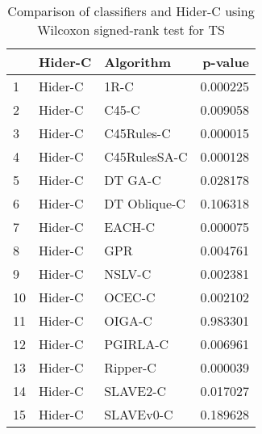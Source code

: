 \begin{table}
\footnotesize
\caption{Comparison of classifiers and Hider-C using Wilcoxon signed-rank test for TS}
\label{tab:Hider-C wilcoxon TS comparison}
\begin{tabular}{lllr}
\hline
 & Hider-C & Algorithm & p-value \\
\hline
1 & Hider-C & 1R-C & 0.000225 \\
2 & Hider-C & C45-C & 0.009058 \\
3 & Hider-C & C45Rules-C & 0.000015 \\
4 & Hider-C & C45RulesSA-C & 0.000128 \\
5 & Hider-C & DT GA-C & 0.028178 \\
6 & Hider-C & DT Oblique-C & 0.106318 \\
7 & Hider-C & EACH-C & 0.000075 \\
8 & Hider-C & GPR & 0.004761 \\
9 & Hider-C & NSLV-C & 0.002381 \\
10 & Hider-C & OCEC-C & 0.002102 \\
11 & Hider-C & OIGA-C & 0.983301 \\
12 & Hider-C & PGIRLA-C & 0.006961 \\
13 & Hider-C & Ripper-C & 0.000039 \\
14 & Hider-C & SLAVE2-C & 0.017027 \\
15 & Hider-C & SLAVEv0-C & 0.189628 \\
\hline
\end{tabular}
\end{table}
